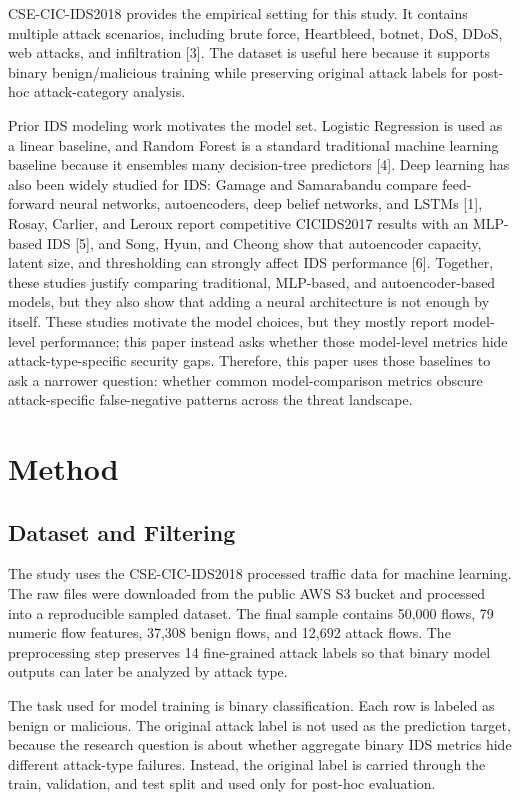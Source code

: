 \documentclass[sigconf,nonacm]{acmart}
\begin{document}
CSE-CIC-IDS2018 provides the empirical setting for this study.
It contains multiple attack scenarios, including brute force, Heartbleed, botnet, DoS, DDoS, web attacks, and infiltration [3].
The dataset is useful here because it supports binary benign/malicious training while preserving original attack labels for post-hoc attack-category analysis.

Prior IDS modeling work motivates the model set.
Logistic Regression is used as a linear baseline, and Random Forest is a standard traditional machine learning baseline because it ensembles many decision-tree predictors [4].
Deep learning has also been widely studied for IDS: Gamage and Samarabandu compare feed-forward neural networks, autoencoders, deep belief networks, and LSTMs [1], Rosay, Carlier, and Leroux report competitive CICIDS2017 results with an MLP-based IDS [5], and Song, Hyun, and Cheong show that autoencoder capacity, latent size, and thresholding can strongly affect IDS performance [6].
Together, these studies justify comparing traditional, MLP-based, and autoencoder-based models, but they also show that adding a neural architecture is not enough by itself.
These studies motivate the model choices, but they mostly report model-level performance; this paper instead asks whether those model-level metrics hide attack-type-specific security gaps.
Therefore, this paper uses those baselines to ask a narrower question: whether common model-comparison metrics obscure attack-specific false-negative patterns across the threat landscape.

\section{Method}

\subsection{Dataset and Filtering}

The study uses the CSE-CIC-IDS2018 processed traffic data for machine learning.
The raw files were downloaded from the public AWS S3 bucket and processed into a reproducible sampled dataset.
The final sample contains 50,000 flows, 79 numeric flow features, 37,308 benign flows, and 12,692 attack flows.
The preprocessing step preserves 14 fine-grained attack labels so that binary model outputs can later be analyzed by attack type.

The task used for model training is binary classification.
Each row is labeled as benign or malicious.
The original attack label is not used as the prediction target, because the research question is about whether aggregate binary IDS metrics hide different attack-type failures.
Instead, the original label is carried through the train, validation, and test split and used only for post-hoc evaluation.
\end{document}

